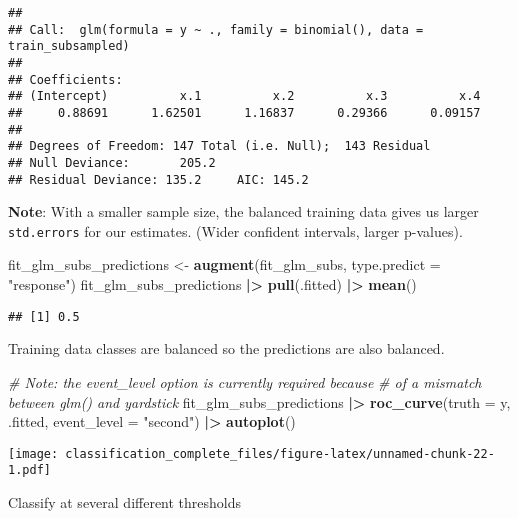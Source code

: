 \documentclass[
]{article}
\newenvironment{Shaded}{\begin{snugshade}}{\end{snugshade}}
\newcommand{\AttributeTok}[1]{\textcolor[rgb]{0.13,0.29,0.53}{#1}}
\newcommand{\CommentTok}[1]{\textcolor[rgb]{0.56,0.35,0.01}{\textit{#1}}}
\newcommand{\FunctionTok}[1]{\textcolor[rgb]{0.13,0.29,0.53}{\textbf{#1}}}
\newcommand{\NormalTok}[1]{#1}
\newcommand{\OtherTok}[1]{\textcolor[rgb]{0.56,0.35,0.01}{#1}}
\newcommand{\SpecialCharTok}[1]{\textcolor[rgb]{0.81,0.36,0.00}{\textbf{#1}}}
\newcommand{\StringTok}[1]{\textcolor[rgb]{0.31,0.60,0.02}{#1}}
\begin{document}
\begin{verbatim}
## 
## Call:  glm(formula = y ~ ., family = binomial(), data = train_subsampled)
## 
## Coefficients:
## (Intercept)          x.1          x.2          x.3          x.4  
##     0.88691      1.62501      1.16837      0.29366      0.09157  
## 
## Degrees of Freedom: 147 Total (i.e. Null);  143 Residual
## Null Deviance:       205.2 
## Residual Deviance: 135.2     AIC: 145.2
\end{verbatim}

\textbf{Note}: With a smaller sample size, the balanced training data
gives us larger \texttt{std.errors} for our estimates. (Wider confident
intervals, larger p-values).

\begin{Shaded}
\begin{Highlighting}[]
\NormalTok{fit\_glm\_subs\_predictions }\OtherTok{\textless{}{-}} \FunctionTok{augment}\NormalTok{(fit\_glm\_subs, }\AttributeTok{type.predict =} \StringTok{"response"}\NormalTok{)}
\NormalTok{fit\_glm\_subs\_predictions }\SpecialCharTok{|\textgreater{}} \FunctionTok{pull}\NormalTok{(.fitted) }\SpecialCharTok{|\textgreater{}} \FunctionTok{mean}\NormalTok{()}
\end{Highlighting}
\end{Shaded}

\begin{verbatim}
## [1] 0.5
\end{verbatim}

Training data classes are balanced so the predictions are also balanced.

\begin{Shaded}
\begin{Highlighting}[]
\CommentTok{\# Note: the event\_level option is currently required because}
\CommentTok{\# of a mismatch between glm() and yardstick}
\NormalTok{fit\_glm\_subs\_predictions }\SpecialCharTok{|\textgreater{}}
  \FunctionTok{roc\_curve}\NormalTok{(}\AttributeTok{truth =}\NormalTok{ y, .fitted,}
            \AttributeTok{event\_level =} \StringTok{"second"}\NormalTok{) }\SpecialCharTok{|\textgreater{}}
  \FunctionTok{autoplot}\NormalTok{()}
\end{Highlighting}
\end{Shaded}

\texttt{[image: classification\_complete\_files/figure-latex/unnamed-chunk-22-1.pdf]}

Classify at several different thresholds
\end{document}
